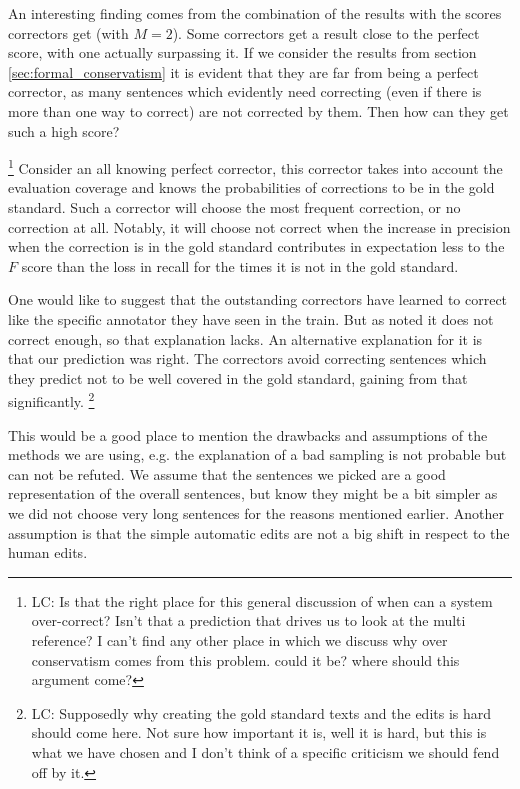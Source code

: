 \documentclass[letter,11pt]{article}
\newcommand{\oa}[1]{\footnote{\color{red}OA: #1}}
\newcommand{\lc}[1]{\footnote{\color{green}LC: #1}}
\begin{document}
		An interesting finding comes from the combination of the results with the scores correctors get (with $M=2$). Some correctors get a result close to the perfect score, with one actually surpassing it. If we consider the results from section \ref{sec:formal_conservatism} it is evident that they are far from being a perfect corrector, as many sentences which evidently need correcting (even if there is more than one way to correct) are not corrected by them. Then how can they get such a high score?
		
		\lc{Is that the right place for this general discussion of when can a system over-correct? Isn't that a prediction that drives us to look at the multi reference? I can't find any other place in which we discuss why over conservatism comes from this problem. could it be? where should this argument come?}
		Consider an all knowing perfect corrector, this corrector takes into account the evaluation coverage and knows the probabilities of corrections to be in the gold standard. Such a corrector will choose the most frequent correction, or no correction at all.  Notably, it will choose not correct when the increase in precision when the correction is in the gold standard contributes in expectation less to the $F$ score than the loss in recall for the times it is not in the gold standard.
		
		One would like to suggest that the outstanding correctors have learned to correct like the specific annotator they have seen in the train. But as noted it does not correct enough, so that explanation lacks. An alternative explanation for it is that our prediction was right. The correctors avoid correcting sentences which they predict not to be well covered in the gold standard, gaining from that significantly.
		\lc{Supposedly why creating the gold standard texts and the edits is hard should come here. Not sure how important it is, well it is hard, but this is what we have chosen and I don't think of a specific criticism we should fend off by it.}
		
		This would be a good place to mention the drawbacks and assumptions of the methods we are using, e.g. the explanation of a bad sampling is not probable but can not be refuted. We assume that the sentences we picked are a good representation of the overall sentences, but know they might be a bit simpler as we did not choose very long sentences for the reasons mentioned earlier. Another assumption is that the simple automatic edits are not a big shift in respect to the human edits.
		
\end{document}
